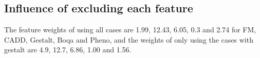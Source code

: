 \documentclass[12pt,cspaper]{paper}
\begin{document}
\subsection{Influence of excluding each feature}
The feature weights of using all cases are 1.99, 12.43, 6.05, 0.3 and
2.74 for FM, CADD, Gestalt, Boqa and Pheno, and the weights of only
using the cases with gestalt are 4.9, 12.7, 6.86, 1.00 and 1.56.


%


%
%

\vfill
\end{document}
